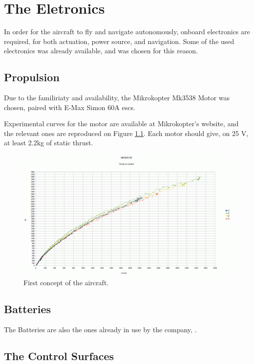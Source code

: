 
\chapter{The Eletronics} \label{chap:conc}

In order for the aircraft to fly and navigate autonomously, onboard electronics are required, for both actuation, power source, and navigation. Some of the used electronics was already available, and was chosen for this reason.
	
\section{Propulsion}

Due to the familiriaty and availability, the Mikrokopter Mk3538 Motor was chosen, paired with E-Max Simon 60A escs.

Experimental curves for the motor are available at Mikrokopter's website, and the relevant ones are reproduced on Figure \ref{fig:motorcurves}. Each motor should give, on 25 V, at least 2.2kg of static thrust. 

\begin{figure}
\centering
  \includegraphics[width=\linewidth]{figs/motorcurves.png}
  \caption{First concept of the aircraft.}
  \label{fig:motorcurves}
\end{figure}


\section{Batteries}

The Batteries are also the ones already in use by the company, .

\section{The Control Surfaces}

